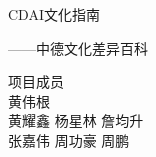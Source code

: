 \documentclass[12pt, notitlepage]{ctexbook}
\begin{document}
	\pagestyle{plain}
	
	\cleardoublepage
	\thispagestyle{empty}
	\begin{titlepage}
	\centering
	\vspace*{6cm}
	\noindent
	\center
	\begin{minipage}{0.7\linewidth}
	\heiti CDAI文化指南\par
	\vspace{12pt}
	\songti ——中德文化差异百科\par
	\vspace{8cm}
	\dinprolight{}
	\raggedright
	项目成员\\
	
	黄伟根\\
	黄耀鑫 \hspace{1em} 杨星林 \hspace{1em} 詹均升 \\
	张嘉伟 \hspace{1em} 周功豪 \hspace{1em} 周鹏 \\
	\end{minipage}
	\end{titlepage}

	\cleardoublepage
	

	\tableofcontents
	\cleardoublepage
	\pagestyle{headings}	
	
	
\end{document}
